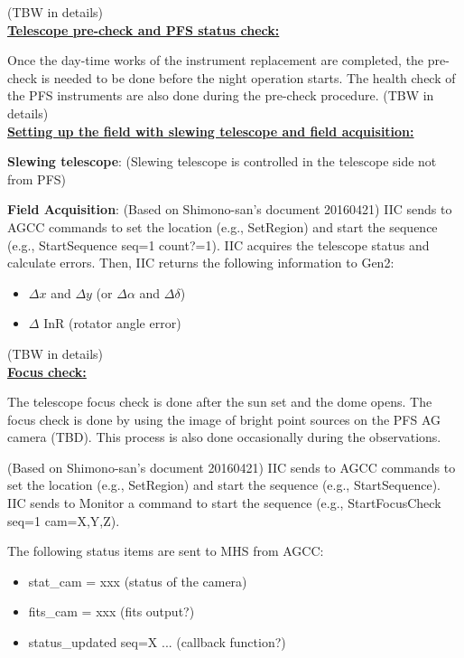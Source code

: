 \documentclass[a4paper]{article}
\begin{document}
(TBW in details)\\

\noindent \underline{\textbf{Telescope pre-check and PFS status check:}}
\vspace{5pt}

Once the day-time works of the instrument replacement are completed, the pre-check is needed to be done before the night operation starts. The health check of the PFS instruments are also done during the pre-check procedure. (TBW in details)\\

\noindent \underline{\textbf{Setting up the field with slewing telescope and field acquisition:}}
\vspace{5pt}

\textbf{Slewing telescope}: 
(Slewing telescope is controlled in the telescope side not from PFS)

\textbf{Field Acquisition}: 
(Based on Shimono-san's document 20160421)
IIC sends to AGCC commands to set the location (e.g., SetRegion) and start the sequence (e.g., StartSequence seq=1 count?=1). IIC acquires the telescope status and calculate errors. Then, IIC returns the following information to Gen2: 
\begin{itemize}
\item $\Delta x$ and $\Delta y$ (or $\Delta \alpha$ and $\Delta \delta$)
\item $\Delta$ InR (rotator angle error)
\end{itemize}

(TBW in details)\\

\noindent \underline{\textbf{Focus check:}}
\vspace{5pt}

The telescope focus check is done after the sun set and the dome opens. The focus check is done by using the image of bright point sources on the PFS AG camera (TBD). This process is also done occasionally during the observations. 

(Based on Shimono-san's document 20160421)
IIC sends to AGCC commands to set the location (e.g., SetRegion) and start the sequence (e.g., StartSequence). IIC sends to Monitor a command to start the sequence (e.g., StartFocusCheck seq=1 cam=X,Y,Z).

The following status items are sent to MHS from AGCC:
\begin{itemize}
\item stat\_cam = xxx (status of the camera)
\item fits\_cam = xxx (fits output?)
\item status\_updated seq=X ... (callback function?)
\end{itemize}
\end{document}
